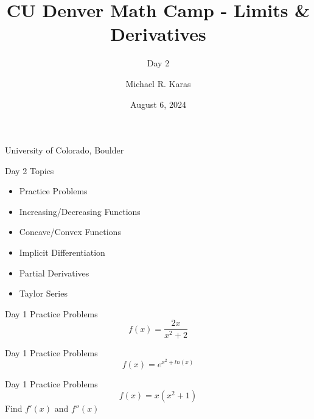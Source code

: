 \documentclass[aspectratio=169]{beamer}
\title{CU Denver Math Camp - Limits \& Derivatives}
\subtitle{Day 2}
\date{August 6, 2024}
\author{Michael R. Karas}
\begin{document}
\begin{frame}
\maketitle

{\footnotesize University of Colorado, Boulder}
\end{frame}

\begin{frame}{Day 2 Topics}\label{main1}

\begin{itemize}
	\begin{itemize}
		\item Practice Problems		
		\item Increasing/Decreasing Functions
		\item Concave/Convex Functions
		\item Implicit Differentiation
		\item Partial Derivatives
		\item Taylor Series
	\end{itemize}
\end{itemize}
\end{frame}

\begin{frame}{Day 1 Practice Problems}\label{main1}
	\vspace{-4cm}
    \[
    f(x) = \frac{2x}{x^{2}+2}
    \]
\end{frame}

\begin{frame}{Day 1 Practice Problems}\label{main1}
	\vspace{-4cm}
    \[
    f(x) = e^{x^{2} + ln(x)}
    \]
\end{frame}

\begin{frame}{Day 1 Practice Problems}\label{main1}
	\vspace{-4cm}
    \[
    f(x) = x(x^{2} + 1)
    \]
    Find \( f'(x) \) and \( f''(x) \)
\end{frame}
\end{document}
